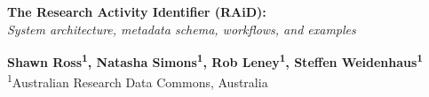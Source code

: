 \documentclass[a0,portrait]{a0poster}
\begin{document}
\noindent\begin{minipage}[t]{\linewidth}
\Huge \color{ARDCBlue} \textbf{The Research Activity Identifier (RAiD):} \color{Black}\\[0.3cm]
\LARGE\textit{System architecture, metadata schema, workflows, and examples}\\[1cm]
\end{minipage}

\noindent\begin{minipage}[t]{0.75\linewidth}
\Large \textbf{Shawn Ross\textsuperscript{1}, Natasha Simons\textsuperscript{1}, Rob Leney\textsuperscript{1}, Steffen Weidenhaus\textsuperscript{1}}\\[0.5cm]
\large \textsuperscript{1}Australian Research Data Commons, Australia
\end{minipage}%
\begin{minipage}[t]{0.25\linewidth}
\raggedleft
{}
\end{minipage}

\vspace{1cm}
\end{document}
